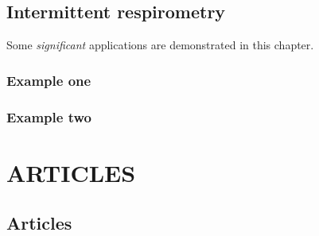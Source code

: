 \documentclass[]{book}
\begin{document}
\chapter{Intermittent respirometry}\label{intermittent-respirometry}

Some \emph{significant} applications are demonstrated in this chapter.

\section{Example one}\label{example-one}

\section{Example two}\label{example-two}

\part*{ARTICLES}\label{part-articles}

\chapter{Articles}\label{articles}


\end{document}
